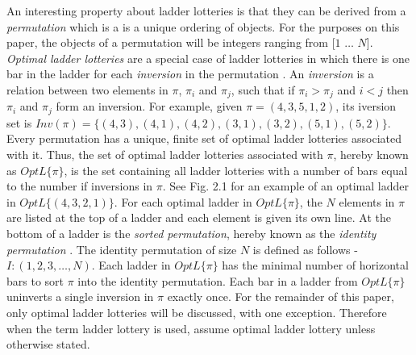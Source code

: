 An interesting property about ladder lotteries is that they can be derived from a 
\emph{permutation} which is a is a unique ordering of objects. \cite{A1}
For the purposes on this paper, the objects of a permutation will be integers 
ranging from [$1$ $\dots$ $N$]. \emph{Optimal ladder lotteries} are a special case of ladder 
lotteries in which there is one bar in the ladder for each \emph{inversion} in the permutation \cite{A1}.
An \emph{inversion} is a relation between two elements in $\pi$, 
$\pi_{i}$ and $\pi_{j}$, such that if $\pi_{i}>\pi_{j}$ and $i<j$ then $\pi_{i}$ and $\pi_{j}$ 
form an inversion. 
For example, given $\pi=(4,3,5,1,2)$, its iversion set is $Inv(\pi) =\{(4,3),(4,1),(4,2),(3,1),(3,2),(5,1),(5,2)\}$.
Every permutation has a unique, finite set of optimal ladder lotteries associated with it. 
 Thus, the set of optimal ladder lotteries associated with $\pi$, 
 hereby known as \emph{$OptL\{\pi\}$}, is the set containing all ladder lotteries 
 with a number of bars equal to the number if inversions in $\pi$. 
 See Fig. 2.1 for an example of an optimal ladder in $OptL\{(4,3,2,1)\}$.
 For each optimal ladder in $OptL\{\pi\}$, the $N$ 
 elements in $\pi$ are listed at the top of a ladder and each 
 element is given its own line. 
 At the bottom of a ladder is the \emph{sorted permutation}, 
 hereby known as the \emph{identity permutation} \cite{A1}. 
 The  identity permutation of size $N$ is defined as follows - $I:(1, 2, 3, \dots, N)$. 
 Each ladder in $OptL\{\pi\}$ has the minimal number of horizontal bars to sort $\pi$ 
 into the identity permutation. Each bar in a ladder from $OptL\{\pi\}$ uninverts a single 
 inversion in $\pi$ exactly once. For the remainder of this paper, only optimal ladder 
 lotteries will be discussed, with one exception. Therefore when the term ladder lottery is used, assume 
 optimal ladder lottery unless otherwise stated.\par
 
